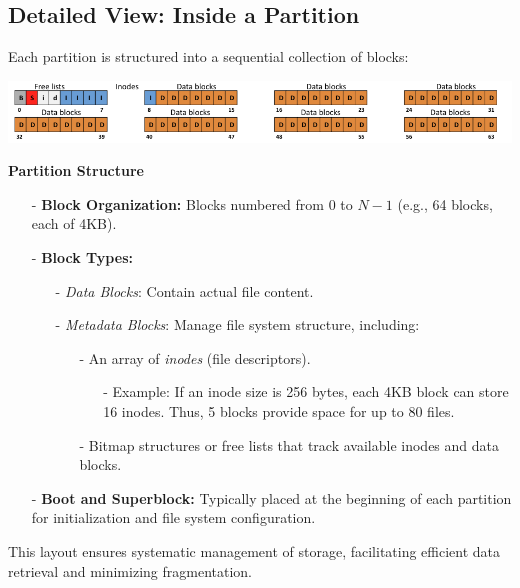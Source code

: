 \documentclass[../../compsys.tex]{subfiles}
\begin{document}
\subsection{Detailed View: Inside a Partition}
Each partition is structured into a sequential collection of blocks:
\begin{center}
     \includegraphics[width=1\textwidth]{chapters/L6/images/storage-block.png}
\end{center}

\textbf{Partition Structure}\\
\begin{itemize}[itemsep=2pt, topsep=1pt]
      \item[-] \textbf{Block Organization:} Blocks numbered from $0$ to $N-1$ (e.g., 64 blocks, each of 4KB).
      \item[-] \textbf{Block Types:}
      \begin{itemize}
          \item[-] \textit{Data Blocks}: Contain actual file content.
          \item[-] \textit{Metadata Blocks}: Manage file system structure, including:
          \begin{itemize}
              \item[-] An array of \textit{inodes} (file descriptors).
              \begin{itemize}
                  \item[-] Example: If an inode size is 256 bytes, each 4KB block can store 16 inodes. Thus, 5 blocks provide space for up to 80 files.
              \end{itemize}
              \item[-] Bitmap structures or free lists that track available inodes and data blocks.
          \end{itemize}
      \end{itemize}
      \item[-] \textbf{Boot and Superblock:} Typically placed at the beginning of each partition for initialization and file system configuration.
  \end{itemize}


This layout ensures systematic management of storage, facilitating efficient data retrieval and minimizing fragmentation.
\end{document}
